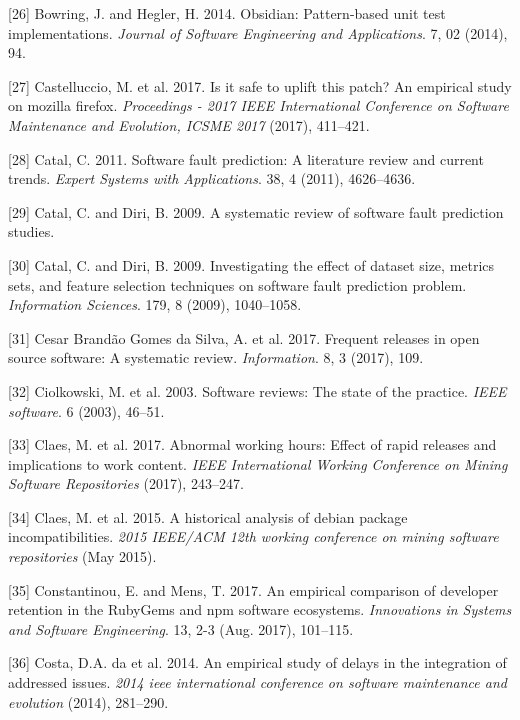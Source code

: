 \documentclass[]{book}
\begin{document}
\hypertarget{ref-bowring2014obsidian}{}
{[}26{]} Bowring, J. and Hegler, H. 2014. Obsidian: Pattern-based unit
test implementations. \emph{Journal of Software Engineering and
Applications}. 7, 02 (2014), 94.

\hypertarget{ref-castelluccio2017a}{}
{[}27{]} Castelluccio, M. et al. 2017. Is it safe to uplift this patch?
An empirical study on mozilla firefox. \emph{Proceedings - 2017 IEEE
International Conference on Software Maintenance and Evolution, ICSME
2017} (2017), 411--421.

\hypertarget{ref-Catal2011}{}
{[}28{]} Catal, C. 2011. Software fault prediction: A literature review
and current trends. \emph{Expert Systems with Applications}. 38, 4
(2011), 4626--4636.

\hypertarget{ref-Catal2009review}{}
{[}29{]} Catal, C. and Diri, B. 2009. A systematic review of software
fault prediction studies.

\hypertarget{ref-Catal2009investigating}{}
{[}30{]} Catal, C. and Diri, B. 2009. Investigating the effect of
dataset size, metrics sets, and feature selection techniques on software
fault prediction problem. \emph{Information Sciences}. 179, 8 (2009),
1040--1058.

\hypertarget{ref-cesar2017a}{}
{[}31{]} Cesar Brandão Gomes da Silva, A. et al. 2017. Frequent releases
in open source software: A systematic review. \emph{Information}. 8, 3
(2017), 109.

\hypertarget{ref-ciolkowski2003software}{}
{[}32{]} Ciolkowski, M. et al. 2003. Software reviews: The state of the
practice. \emph{IEEE software}. 6 (2003), 46--51.

\hypertarget{ref-claes2017a}{}
{[}33{]} Claes, M. et al. 2017. Abnormal working hours: Effect of rapid
releases and implications to work content. \emph{IEEE International
Working Conference on Mining Software Repositories} (2017), 243--247.

\hypertarget{ref-Claes2015}{}
{[}34{]} Claes, M. et al. 2015. A historical analysis of debian package
incompatibilities. \emph{2015 IEEE/ACM 12th working conference on mining
software repositories} (May 2015).

\hypertarget{ref-Constantinou2017}{}
{[}35{]} Constantinou, E. and Mens, T. 2017. An empirical comparison of
developer retention in the RubyGems and npm software ecosystems.
\emph{Innovations in Systems and Software Engineering}. 13, 2-3 (Aug.
2017), 101--115.

\hypertarget{ref-da2014a}{}
{[}36{]} Costa, D.A. da et al. 2014. An empirical study of delays in the
integration of addressed issues. \emph{2014 ieee international
conference on software maintenance and evolution} (2014), 281--290.
\end{document}
